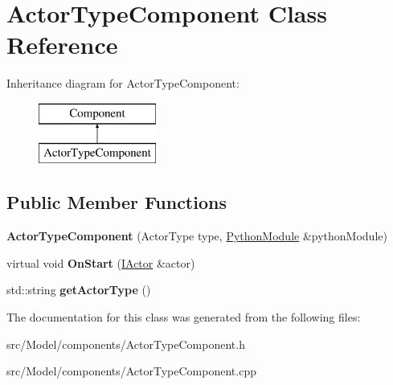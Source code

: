 \hypertarget{classActorTypeComponent}{}\section{Actor\+Type\+Component Class Reference}
\label{classActorTypeComponent}
Inheritance diagram for Actor\+Type\+Component\+:\begin{figure}[H]
\begin{center}
\leavevmode
\includegraphics[height=2.000000cm]{classActorTypeComponent}
\end{center}
\end{figure}
\subsection*{Public Member Functions}
\begin{DoxyCompactItemize}
\item 
{\bfseries Actor\+Type\+Component} (Actor\+Type type, \hyperlink{classPythonModule}{Python\+Module} \&python\+Module)\hypertarget{classActorTypeComponent_ad7501c6cbcb34fb5152f40ba3914a1b9}{}\label{classActorTypeComponent_ad7501c6cbcb34fb5152f40ba3914a1b9}

\item 
virtual void {\bfseries On\+Start} (\hyperlink{classIActor}{I\+Actor} \&actor)\hypertarget{classActorTypeComponent_a04af8d4297a9aeb340af3af95ca0ed1e}{}\label{classActorTypeComponent_a04af8d4297a9aeb340af3af95ca0ed1e}

\item 
std\+::string {\bfseries get\+Actor\+Type} ()\hypertarget{classActorTypeComponent_a55143b2857baa0dfe7875d7c0a2271ca}{}\label{classActorTypeComponent_a55143b2857baa0dfe7875d7c0a2271ca}

\end{DoxyCompactItemize}


The documentation for this class was generated from the following files\+:\begin{DoxyCompactItemize}
\item 
src/\+Model/components/Actor\+Type\+Component.\+h\item 
src/\+Model/components/Actor\+Type\+Component.\+cpp\end{DoxyCompactItemize}
